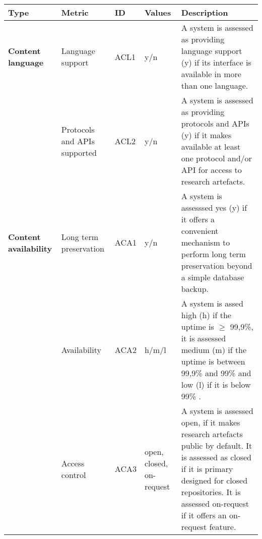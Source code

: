 \begin{tabular}{|m{2.5cm}|m{3cm}|m{1cm}|m{1cm}|p{8cm}|}
\hline \textbf{Type}&\textbf{Metric}&\textbf{ID}&\textbf{Values}&\textbf{Description}\\ \hline
\textbf{Content language}&Language support&ACL1&y/n&A system is assessed as providing language support (y) if its interface is available in more than one language.\\ \hline
\textbf{}&Protocols and APIs supported&ACL2&y/n&A system is assessed as providing protocols and APIs (y) if it makes available at least one protocol and/or API for access to research artefacts.\\ \hline
\textbf{Content availability}&Long term preservation&ACA1&y/n&A system is assesssed yes (y) if it offers a convenient mechanism to perform long term preservation beyond a simple database backup.\\ \hline
\textbf{}&Availability&ACA2&h/m/l&A system is assed high (h) if the uptime is $\geq$ 99,9\%, it is assessed medium (m) if the uptime is between 99,9\% and 99\% and low (l) if it is below 99\% .\\ \hline
\textbf{}&Access control&ACA3&open, closed, on-request&A system is assessed open, if it makes research artefacts public by default. It is assessed as closed if it is primary designed for closed repositories. It is assessed on-request if it offers an on-request feature.\\ \hline
\end{tabular}



